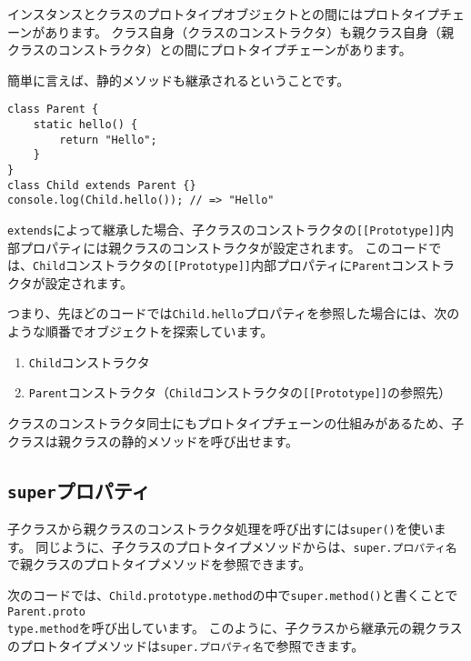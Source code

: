 インスタンスとクラスのプロトタイプオブジェクトとの間にはプロトタイプチェーンがあります。
クラス自身（クラスのコンストラクタ）も親クラス自身（親クラスのコンストラクタ）との間にプロトタイプチェーンがあります。

簡単に言えば、静的メソッドも継承されるということです。

\begin{lstlisting}
class Parent {
    static hello() {
        return "Hello";
    }
}
class Child extends Parent {}
console.log(Child.hello()); // => "Hello"
\end{lstlisting}

\texttt{extends}によって継承した場合、子クラスのコンストラクタの\texttt{[[Prototype]]}内部プロパティには親クラスのコンストラクタが設定されます。
このコードでは、\texttt{Child}コンストラクタの\texttt{[[Prototype]]}内部プロパティに\texttt{Parent}コンストラクタが設定されます。

つまり、先ほどのコードでは\texttt{Child.hello}プロパティを参照した場合には、次のような順番でオブジェクトを探索しています。

\begin{enumerate}
\def\labelenumi{\arabic{enumi}.}
\item
  \texttt{Child}コンストラクタ
\item
  \texttt{Parent}コンストラクタ（\texttt{Child}コンストラクタの\texttt{[[Prototype]]}の参照先）
\end{enumerate}

クラスのコンストラクタ同士にもプロトタイプチェーンの仕組みがあるため、子クラスは親クラスの静的メソッドを呼び出せます。

\hypertarget{super-property}{%
\subsection{\texorpdfstring{\texttt{super}プロパティ}{superプロパティ}}\label{super-property}}

子クラスから親クラスのコンストラクタ処理を呼び出すには\texttt{super()}を使います。
同じように、子クラスのプロトタイプメソッドからは、\texttt{super.\hbox{}プロパティ名}で親クラスのプロトタイプメソッドを参照できます。

次のコードでは、\texttt{Child.prototype.method}の中で\texttt{super.method()}と書くことで\texttt{Parent.proto\\type.method}を呼び出しています。
このように、子クラスから継承元の親クラスのプロトタイプメソッドは\texttt{super.\hbox{}プロパティ名}で参照できます。

